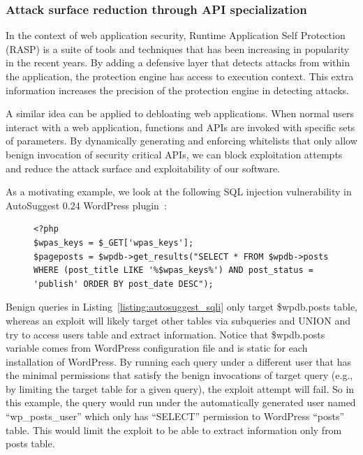 \subsubsection{Attack surface reduction through API specialization}
In the context of web application security, Runtime Application Self Protection (RASP) is a suite of tools and techniques that has been increasing in popularity in the recent years. By adding a defensive layer that detects attacks from within the application, the protection engine has access to execution context. This extra information increases the precision of the protection engine in detecting attacks.

A similar idea can be applied to debloating web applications. When normal users interact with a web application, functions and APIs are invoked with specific sets of parameters. By dynamically generating and enforcing whitelists that only allow benign invocation of security critical APIs, we can block exploitation attempts and reduce the attack surface and exploitability of our software.

As a motivating example, we look at the following SQL injection vulnerability in AutoSuggest 0.24 WordPress plugin~\cite{autosuggest_vulnerability}:

\begin{figure}[t]
\begin{lstlisting}[frame=single, caption={PHP code from AutoSuggest WordPress plugin with SQL injection vulnerability},captionpos=b, label={listing:autosuggest_sqli}]
<?php
$wpas_keys = $_GET['wpas_keys'];
$pageposts = $wpdb->get_results("SELECT * FROM $wpdb->posts
WHERE (post_title LIKE '%$wpas_keys%') AND post_status = 'publish' ORDER BY post_date DESC");
\end{lstlisting}
\end{figure}

Benign queries in Listing~\ref{listing:autosuggest_sqli} only target \$wpdb.posts table, whereas an exploit will likely target other tables via subqueries and UNION and try to access users table and extract information. Notice that \$wpdb.posts variable comes from WordPress configuration file and is static for each installation of WordPress.
By running each query under a different user that has the minimal permissions that satisfy the benign invocations of target query (e.g., by limiting the target table for a given query), the exploit attempt will fail.
So in this example, the query would run under the automatically generated user named ``wp\_posts\_user'' which only has ``SELECT'' permission to WordPress ``posts'' table. This would limit the exploit to be able to extract information only from posts table.

